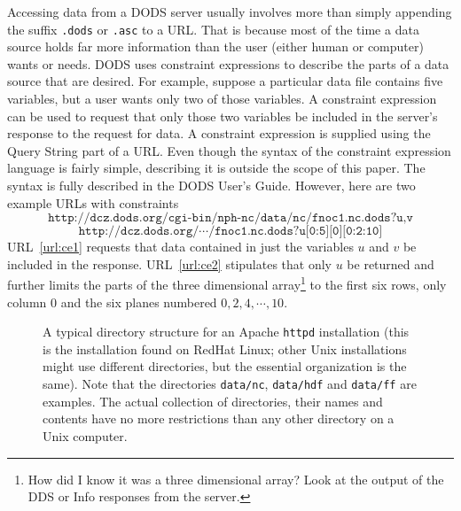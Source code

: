 \documentclass{article}
\begin{document}
Accessing data from a DODS server usually involves more than simply appending
the suffix \texttt{.dods} or \texttt{.asc} to a URL. That is because most of
the time a data source holds far more information than the user (either human
or computer) wants or needs. DODS uses constraint expressions to describe the
parts of a data source that are desired. For example, suppose a particular
data file contains five variables, but a user wants only two of those
variables. A constraint expression can be used to request that only those two
variables be included in the server's response to the request for data. A
constraint expression is supplied using the Query String part of a URL. Even
though the syntax of the constraint expression language is fairly simple,
describing it is outside the scope of this paper. The syntax is fully
described in the DODS User's Guide. However, here are
two example URLs with constraints
\begin{equation}
\texttt{http://dcz.dods.org/cgi-bin/nph-nc/data/nc/fnoc1.nc.dods?u,v}
\label{url:ce1}
\end{equation}
\begin{equation}
\texttt{http://dcz.dods.org/} \cdots \texttt{/fnoc1.nc.dods?u[0:5][0][0:2:10]}
\label{url:ce2}
\end{equation}
URL~\ref{url:ce1} requests that data contained in just the variables $u$ and
$v$ be included in the response. URL~\ref{url:ce2} stipulates that only $u$
be returned and further limits the parts of the three dimensional
array\footnote{How did I know it was a three dimensional array? Look at the
  output of the DDS or Info responses from the server.} to the first six
rows, only column $0$ and the six planes numbered $0, 2, 4, \cdots, 10$.

\begin{figure}[h]
\begin{center}
\caption{A typical directory structure for an Apache \texttt{httpd}
  installation (this is the installation found on RedHat Linux; other Unix
  installations might use different directories, but the essential
  organization is the same). Note that the directories \texttt{data/nc},
  \texttt{data/hdf} and \texttt{data/ff} are examples. The actual collection
  of directories, their names and contents have no more restrictions than any
  other directory on a Unix computer.}
\label{fig:httpd-directories}
\end{center}
\end{figure}
\end{document}
